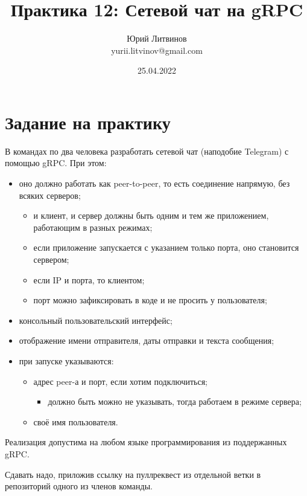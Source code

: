 \documentclass[a5paper]{article}
\title{Практика 12: Сетевой чат на gRPC}
\author{Юрий Литвинов\\\small{yurii.litvinov@gmail.com}}
\date{25.04.2022}
\begin{document}
\maketitle
\thispagestyle{empty}

\section{Задание на практику}

В командах по два человека разработать сетевой чат (наподобие Telegram) с помощью gRPC. При этом:

\begin{itemize}
    \item оно должно работать как peer-to-peer, то есть соединение напрямую, без всяких серверов;
    \begin{itemize}
        \item и клиент, и сервер должны быть одним и тем же приложением, работающим в разных режимах;
        \item если приложение запускается с указанием только порта, оно становится сервером;
        \item если IP и порта, то клиентом;
        \item порт можно зафиксировать в коде и не просить у пользователя;
    \end{itemize}
    \item консольный пользовательский интерфейс;
    \item отображение имени отправителя, даты отправки и текста сообщения;
    \item при запуске указываются:
    \begin{itemize}
        \item адрес peer-а и порт, если хотим подключиться;
        \begin{itemize}
            \item должно быть можно не указывать, тогда работаем в режиме сервера;
        \end{itemize}
        \item своё имя пользователя.
    \end{itemize}
\end{itemize}

Реализация допустима на любом языке программирования из поддержанных gRPC.

Сдавать надо, приложив ссылку на пуллреквест из отдельной ветки в репозиторий одного из членов команды.
\end{document}
